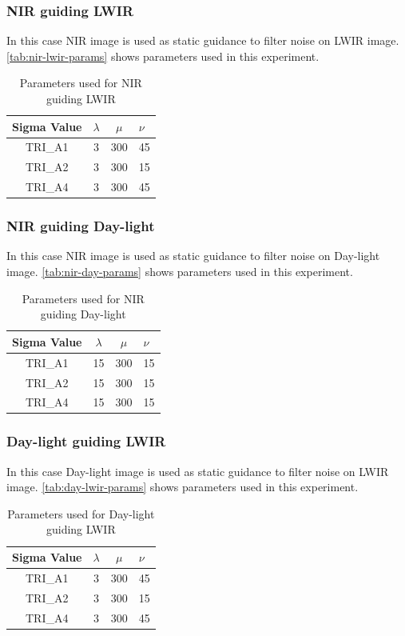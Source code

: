 \documentclass[10pt,twocolumn,letterpaper]{article}
\begin{document}
\subsubsection{NIR guiding LWIR}
In this case NIR image is used as static guidance to filter noise on LWIR image. \autoref{tab:nir-lwir-params} shows parameters used in this experiment.
\begin{table}[!ht]
	\centering
	\caption{Parameters used for NIR guiding LWIR}
	\label{tab:nir-lwir-params}
	\begin{tabular}{@{}cccl@{}}
		\toprule
		\bfseries Sigma Value & \(\lambda\) & \(\mu\) & \(\nu\) \\ \midrule
		TRI\_A1               & 3        	& 300	  & 45       \\
		TRI\_A2               & 3        	& 300	  & 15       \\
		TRI\_A4               & 3        	& 300	  & 45       \\ \bottomrule
	\end{tabular}
\end{table}
\subsubsection{NIR guiding Day-light}
In this case NIR image is used as static guidance to filter noise on Day-light image. \autoref{tab:nir-day-params} shows parameters used in this experiment.
\begin{table}[!ht]
	\centering
	\caption{Parameters used for NIR guiding Day-light}
	\label{tab:nir-day-params}
	\begin{tabular}{@{}cccl@{}}
		\toprule
		\bfseries Sigma Value & \(\lambda\) & \(\mu\) & \(\nu\) \\ \midrule
		TRI\_A1               & 15			& 300	  & 15       \\
		TRI\_A2               & 15			& 300	  & 15        \\
		TRI\_A4               & 15			& 300	  & 15        \\ \bottomrule
	\end{tabular}
\end{table}
\subsubsection{Day-light guiding LWIR}
In this case Day-light image is used as static guidance to filter noise on LWIR image. \autoref{tab:day-lwir-params} shows parameters used in this experiment.
\begin{table}[!ht]
	\centering
	\caption{Parameters used for Day-light guiding LWIR}
	\label{tab:day-lwir-params}
	\begin{tabular}{@{}cccl@{}}
		\toprule
		\bfseries Sigma Value & \(\lambda\) & \(\mu\) & \(\nu\) \\ \midrule
		TRI\_A1               & 3        	& 300	  & 45       \\
		TRI\_A2               & 3        	& 300	  & 15       \\
		TRI\_A4               & 3        	& 300	  & 45       \\ \bottomrule
	\end{tabular}
\end{table}
\end{document}
